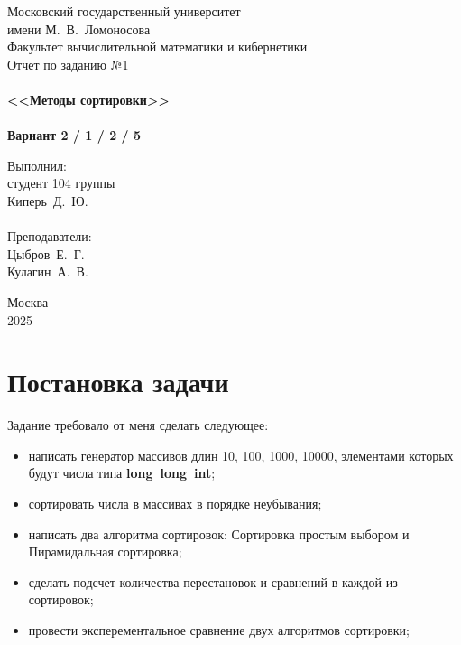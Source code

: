 \documentclass[a4paper,12pt,titlepage,finall]{article}
\begin{document}
\begin{titlepage}
    \begin{center}
	{\small \sc Московский государственный университет \\имени М.~В.~Ломоносова\\
	Факультет вычислительной математики и кибернетики\\}
	\vfill
	{\Large \sc Отчет по заданию №1}\\
~\\
	{\large \bf <<Методы сортировки>>}\\ 
~\\
	{\large \bf Вариант 2 / 1 / 2 / 5}
    \end{center}
    \begin{flushright}
	\vfill {Выполнил:\\
	студент 104 группы\\
	Киперь~Д.~Ю.\\
~\\
	Преподаватели:\\
	Цыбров~Е.~Г.\\
    Кулагин~А.~В.}
    \end{flushright}
    \begin{center}
	\vfill
	{\small Москва\\2025}
    \end{center}
\end{titlepage}

\tableofcontents
\newpage

\section{Постановка задачи}
{\large Задание требовало от меня сделать следующее:}

\begin{itemize}
    \item написать генератор массивов длин 10, 100, 1000, 10000, элементами которых будут числа типа \textbf{long~long~int}; 
    \item сортировать числа в массивах в порядке неубывания;
    \item написать два алгоритма сортировок: Сортировка простым выбором и Пирамидальная сортировка;
    \item сделать подсчет количества перестановок и сравнений в каждой из сортировок;
    \item провести эксперементальное сравнение двух алгоритмов сортировки;
\end{itemize}
\newpage
\end{document}
